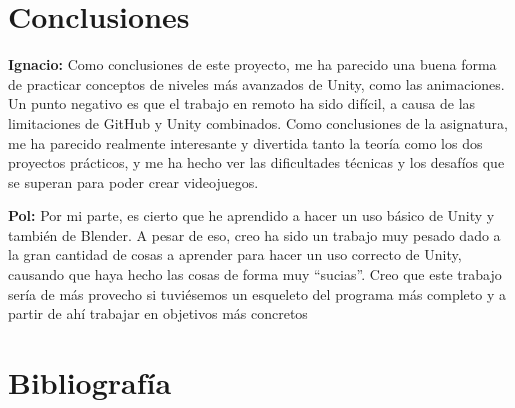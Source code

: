 \documentclass{article}
\begin{document}
\section{Conclusiones}
\textbf{Ignacio:}  Como conclusiones de este proyecto, me ha parecido una buena forma de practicar conceptos de niveles más avanzados de Unity, como las animaciones.
Un punto negativo es que el trabajo en remoto ha sido difícil, a causa de las limitaciones de GitHub y Unity combinados.
Como conclusiones de la asignatura, me ha parecido realmente interesante y divertida tanto la teoría como los dos proyectos prácticos, y me ha hecho ver las dificultades técnicas y los desafíos que se superan para poder crear videojuegos.

\textbf{Pol:}  Por mi parte, es cierto que he aprendido a hacer un uso básico de Unity y también de Blender.
A pesar de eso, creo ha sido un trabajo muy pesado dado a la gran cantidad de cosas a aprender para hacer un uso correcto de Unity, causando que haya hecho las cosas de forma muy “sucias”.
Creo que este trabajo sería de más provecho si tuviésemos un esqueleto del programa más completo y a partir de ahí trabajar en objetivos más concretos 

\section{Bibliografía}
\end{document}
